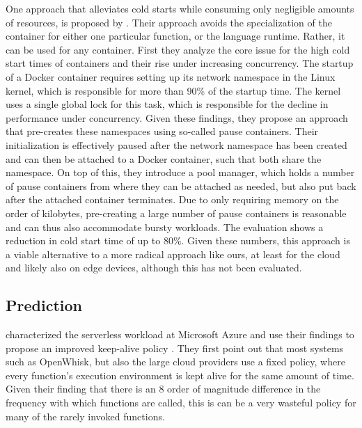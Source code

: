 One approach that alleviates cold starts while consuming only negligible amounts of resources, is proposed by \citeauthor{Mohan2019} \cite{Mohan2019}. Their approach avoids the specialization of the container for either one particular function, or the language runtime. Rather, it can be used for any container. First they analyze the core issue for the high cold start times of containers and their rise under increasing concurrency. The startup of a Docker container requires setting up its network namespace in the Linux kernel, which is responsible for more than 90\% of the startup time. The kernel uses a single global lock for this task, which is responsible for the decline in performance under concurrency. Given these findings, they propose an approach that pre-creates these namespaces using so-called pause containers. Their initialization is effectively paused after the network namespace has been created and can then be attached to a Docker container, such that both share the namespace. On top of this, they introduce a pool manager, which holds a number of pause containers from where they can be attached as needed, but also put back after the attached container terminates. Due to only requiring memory on the order of kilobytes, pre-creating a large number of pause containers is reasonable and can thus also accommodate bursty workloads. The evaluation shows a reduction in cold start time of up to 80\%. Given these numbers, this approach is a viable alternative to a more radical approach like ours, at least for the cloud and likely also on edge devices, although this has not been evaluated.



\subsection{Prediction}

\citeauthor{Shahrad2020} characterized the serverless workload at Microsoft Azure and use their findings to propose an improved keep-alive policy \cite{Shahrad2020}. They first point out that most systems such as OpenWhisk, but also the large cloud providers use a fixed policy, where every function's execution environment is kept alive for the same amount of time. Given their finding that there is an 8 order of magnitude difference in the frequency with which functions are called, this is can be a very wasteful policy for many of the rarely invoked functions.


